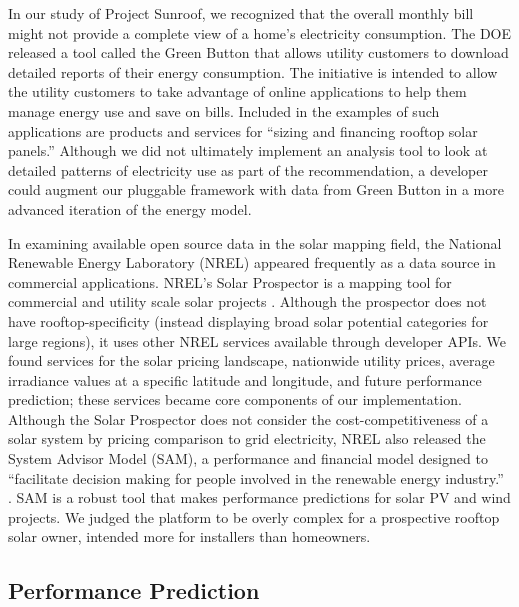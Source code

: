 \documentclass[pageno]{jpaper}
\begin{document}
In our study of Project Sunroof, we recognized that the overall monthly bill might not provide a complete view of a home's electricity consumption. The DOE released a tool called the Green Button that allows utility customers to download detailed reports of their energy consumption. The initiative is intended to allow the utility customers to take advantage of online applications to help them manage energy use and save on bills. Included in the examples of such applications are products and services for ``sizing and financing rooftop solar panels.'' Although we did not ultimately implement an analysis tool to look at detailed patterns of electricity use as part of the recommendation, a developer could augment our pluggable framework with data from Green Button in a more advanced iteration of the energy model.

In examining available open source data in the solar mapping field, the National Renewable Energy Laboratory (NREL) appeared frequently as a data source in commercial applications. NREL's Solar Prospector is a mapping tool for commercial and utility scale solar projects \cite{Prospector}. Although the prospector does not have rooftop-specificity (instead displaying broad solar potential categories for large regions), it uses other NREL services available through developer APIs. We found services for the solar pricing landscape, nationwide utility prices, average irradiance values at a specific latitude and longitude, and future performance prediction; these services became core components of our implementation. Although the Solar Prospector does not consider the cost-competitiveness of a solar system by pricing comparison to grid electricity, NREL also released the System Advisor Model (SAM), a performance and financial model designed to ``facilitate decision making for people involved in the renewable energy industry.'' \cite{SAM}. SAM is a robust tool that makes performance predictions for solar PV and wind projects. We judged the platform to be overly complex for a prospective rooftop solar owner, intended more for installers than homeowners. 

\subsection{Performance Prediction}
\end{document}
